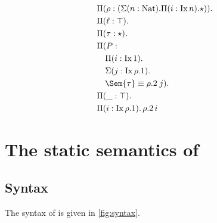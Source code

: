 \documentclass[12pt]{article}
\newcommand\Nat{\mathrm{Nat}}
\newcommand\Ix[1]{\mathrm{Ix} \, #1}
\begin{document}
\begin{align*}
&\Pi (\rho : (\Sigma (n : \Nat). \Pi (i : \Ix n). \star)).\\ 
&\Pi (\ell : \top). \\
&\Pi (\tau : \star). \\
&\Pi (P :      \\
&\quad \Pi (i : \Ix 1). \\
&\quad      \Sigma (j : \Ix {\rho.1}).  \\
&\quad       \Sem{\tau} \equiv {\rho}.2 \; j). \\
&\Pi (\_ : \top). \\
&\Pi (i : \Ix {\rho.1}). \, \rho.2 \, i 
\end{align*}

\appendix

\section{The static semantics of \RO}
\label{app:RO}

\subsection{Syntax}
\label{sec:ro-syntax}

The syntax of \RO [\Thy] is given in \cref{fig:syntax}.  
\end{document}
